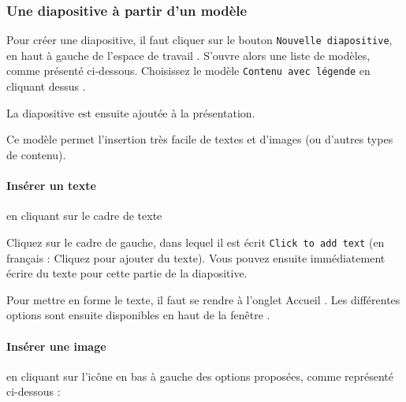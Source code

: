 




\subsubsection{Une diapositive à partir d'un modèle}\label{Presentation1diapoModele}

Pour créer une diapositive, il faut cliquer sur le bouton \texttt{Nouvelle diapositive}, en haut à gauche de l'espace de travail . S'ouvre alors une liste de modèles, comme présenté ci-dessous. Choisissez le modèle \texttt{Contenu avec légende} en cliquant dessus .




La diapositive est ensuite ajoutée à la présentation.


Ce modèle permet l'insertion très facile de textes et d'images (ou d'autres types de contenu).


\paragraph{Insérer un texte} en cliquant sur le cadre de texte

Cliquez sur le cadre de gauche, dans lequel il est écrit \texttt{Click to add text} (en français : Cliquez pour ajouter du texte). Vous pouvez ensuite immédiatement écrire du texte pour cette partie de la diapositive.

Pour mettre en forme le texte, il faut se rendre à l'onglet Accueil . Les différentes options sont ensuite disponibles en haut de la fenêtre .





\paragraph{Insérer une image} en cliquant sur l'icône en bas à gauche des options proposées, comme représenté ci-dessous :

